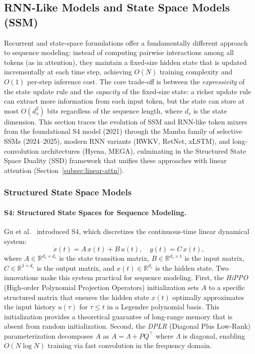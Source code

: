 \subsection{RNN-Like Models and State Space Models (SSM)}
\label{subsec:ssm}

Recurrent and state-space formulations offer a fundamentally different approach to sequence modeling: instead of computing pairwise interactions among all tokens (as in attention), they maintain a fixed-size hidden state that is updated incrementally at each time step, achieving $O(N)$ training complexity and $O(1)$ per-step inference cost. The core trade-off is between the \emph{expressivity} of the state update rule and the \emph{capacity} of the fixed-size state: a richer update rule can extract more information from each input token, but the state can store at most $O(d_s^2)$ bits regardless of the sequence length, where $d_s$ is the state dimension. This section traces the evolution of SSM and RNN-like token mixers from the foundational S4 model (2021) through the Mamba family of selective SSMs (2024--2025), modern RNN variants (RWKV, RetNet, xLSTM), and long-convolution architectures (Hyena, MEGA), culminating in the Structured State Space Duality (SSD) framework that unifies these approaches with linear attention (Section~\ref{subsec:linear-attn}).

\subsubsection{Structured State Space Models}
\label{subsubsec:s4}

\paragraph{S4: Structured State Spaces for Sequence Modeling.}
Gu et al.~\cite{gu2022efficiently} introduced S4, which discretizes the continuous-time linear dynamical system:
\begin{equation}
\dot{x}(t) = A\, x(t) + B\, u(t), \quad y(t) = C\, x(t),
\label{eq:ssm-continuous}
\end{equation}
where $A \in \mathbb{R}^{d_s \times d_s}$ is the state transition matrix, $B \in \mathbb{R}^{d_s \times 1}$ is the input matrix, $C \in \mathbb{R}^{1 \times d_s}$ is the output matrix, and $x(t) \in \mathbb{R}^{d_s}$ is the hidden state. Two innovations make this system practical for sequence modeling. First, the \emph{HiPPO} (High-order Polynomial Projection Operators) initialization sets $A$ to a specific structured matrix that ensures the hidden state $x(t)$ optimally approximates the input history $u(\tau)$ for $\tau \leq t$ in a Legendre polynomial basis. This initialization provides a theoretical guarantee of long-range memory that is absent from random initialization. Second, the \emph{DPLR} (Diagonal Plus Low-Rank) parameterization decomposes $A$ as $A = \Lambda + PQ^\top$ where $\Lambda$ is diagonal, enabling $O(N \log N)$ training via fast convolution in the frequency domain.

